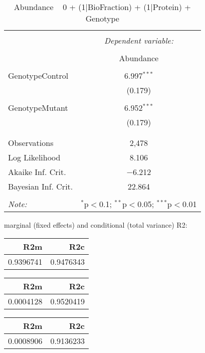 \documentclass[11pt]{report}
\begin{document}
\begin{table}[!htbp] \centering 
  \caption{Abundance ~ 0 + (1|BioFraction) + (1|Protein) + Genotype} 
  \label{} 
\begin{tabular}{@{\extracolsep{5pt}}lc} 
\\[-1.8ex]\hline 
\hline \\[-1.8ex] 
 & \multicolumn{1}{c}{\textit{Dependent variable:}} \\ 
\cline{2-2} 
\\[-1.8ex] & Abundance \\ 
\hline \\[-1.8ex] 
 GenotypeControl & 6.997$^{***}$ \\ 
  & (0.179) \\ 
  & \\ 
 GenotypeMutant & 6.952$^{***}$ \\ 
  & (0.179) \\ 
  & \\ 
\hline \\[-1.8ex] 
Observations & 2,478 \\ 
Log Likelihood & 8.106 \\ 
Akaike Inf. Crit. & $-$6.212 \\ 
Bayesian Inf. Crit. & 22.864 \\ 
\hline 
\hline \\[-1.8ex] 
\textit{Note:}  & \multicolumn{1}{r}{$^{*}$p$<$0.1; $^{**}$p$<$0.05; $^{***}$p$<$0.01} \\ 
\end{tabular} 
\end{table} 
marginal (fixed effects) and conditional (total variance) R2:

\begin{tabular}{r|r}
\hline
R2m & R2c\\
\hline
0.9396741 & 0.9476343\\
\hline
\end{tabular}

\begin{tabular}{r|r}
\hline
R2m & R2c\\
\hline
0.0004128 & 0.9520419\\
\hline
\end{tabular}

\begin{tabular}{r|r}
\hline
R2m & R2c\\
\hline
0.0008906 & 0.9136233\\
\hline
\end{tabular}
\end{document}
